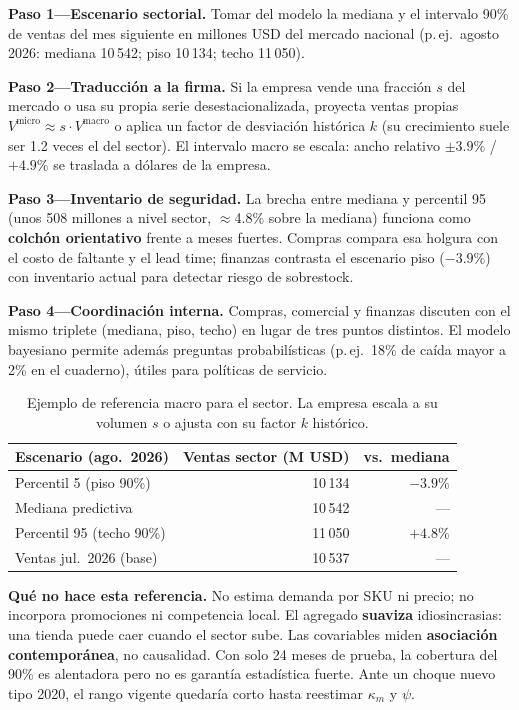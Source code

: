 \documentclass[twocolumn,10pt]{article}
\begin{document}
\textbf{Paso 1---Escenario sectorial.} Tomar del modelo la mediana y el intervalo 90\% de ventas del mes siguiente en millones USD del mercado nacional (p.\,ej.\ agosto 2026: mediana 10\,542; piso 10\,134; techo 11\,050).

\textbf{Paso 2---Traducción a la firma.} Si la empresa vende una fracción $s$ del mercado o usa su propia serie desestacionalizada, proyecta ventas propias $V^{\mathrm{micro}} \approx s \cdot V^{\mathrm{macro}}$ o aplica un factor de desviación histórica $k$ (su crecimiento suele ser 1.2 veces el del sector). El intervalo macro se escala: ancho relativo $\pm 3.9\%$ / $+4.9\%$ se traslada a dólares de la empresa.

\textbf{Paso 3---Inventario de seguridad.} La brecha entre mediana y percentil 95 (unos 508 millones a nivel sector, $\approx$4.8\% sobre la mediana) funciona como \textbf{colchón orientativo} frente a meses fuertes. Compras compara esa holgura con el costo de faltante y el lead time; finanzas contrasta el escenario piso ($-3.9\%$) con inventario actual para detectar riesgo de sobrestock.

\textbf{Paso 4---Coordinación interna.} Compras, comercial y finanzas discuten con el mismo triplete (mediana, piso, techo) en lugar de tres puntos distintos. El modelo bayesiano permite además preguntas probabilísticas (p.\,ej.\ 18\% de caída mayor a 2\% en el cuaderno), útiles para políticas de servicio.

\begin{table}[!ht]
\centering
\small
\begin{tabular}{lrr}
\hline
\textbf{Escenario (ago.\ 2026)} & \textbf{Ventas sector (M USD)} & \textbf{vs.\ mediana} \\
\hline
Percentil 5 (piso 90\%) & 10\,134 & $-3.9\%$ \\
Mediana predictiva & 10\,542 & --- \\
Percentil 95 (techo 90\%) & 11\,050 & $+4.8\%$ \\
Ventas jul.\ 2026 (base) & 10\,537 & --- \\
\hline
\end{tabular}
\caption{Ejemplo de referencia macro para el sector. La empresa escala a su volumen $s$ o ajusta con su factor $k$ histórico.}
\label{tab:aplicacion}
\end{table}

\textbf{Qué no hace esta referencia.} No estima demanda por SKU ni precio; no incorpora promociones ni competencia local. El agregado \textbf{suaviza} idiosincrasias: una tienda puede caer cuando el sector sube. Las covariables miden \textbf{asociación contemporánea}, no causalidad. Con solo 24 meses de prueba, la cobertura del 90\% es alentadora pero no es garantía estadística fuerte. Ante un choque nuevo tipo 2020, el rango vigente quedaría corto hasta reestimar $\kappa_m$ y $\psi$.
\end{document}
